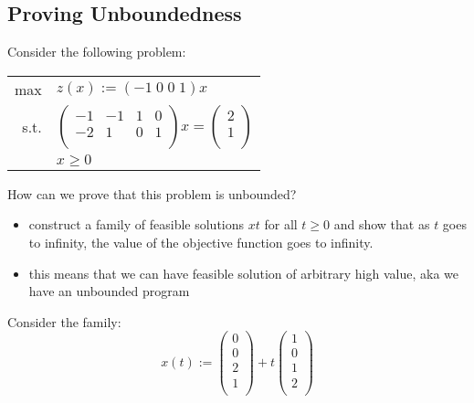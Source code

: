 \documentclass[letterpaper, 12pt]{article}
\begin{document}
    \subsection{Proving Unboundedness}
    Consider the following problem:\\
    \begin{center}
        \begin{tabular}{rl}
            max & $z(x) := (-1 \; 0 \; 0 \; 1)x$\\
            s.t. & $\begin{pmatrix}
                -1 & -1 & 1 & 0\\
                -2 & 1 & 0 & 1\\
            \end{pmatrix} x = \begin{pmatrix}
                2\\
                1\\
            \end{pmatrix}$\\
            & $x \geq 0$\\
        \end{tabular}
    \end{center}

    How can we prove that this problem is unbounded?\\
    \begin{itemize}
        \item construct a family of feasible solutions $x{t}$ for all $t \geq 0$ and show that
        as $t$ goes to infinity, the value of the objective function goes to infinity.
        \item this means that we can have feasible solution of arbitrary high value, aka we have an unbounded program 
    \end{itemize}
    \bigskip
    Consider the family:
    $$x(t) := \begin{pmatrix}
        0\\
        0\\
        2\\
        1\\
    \end{pmatrix} + t\begin{pmatrix}
        1\\
        0\\
        1\\
        2\\
    \end{pmatrix}$$
\end{document}
